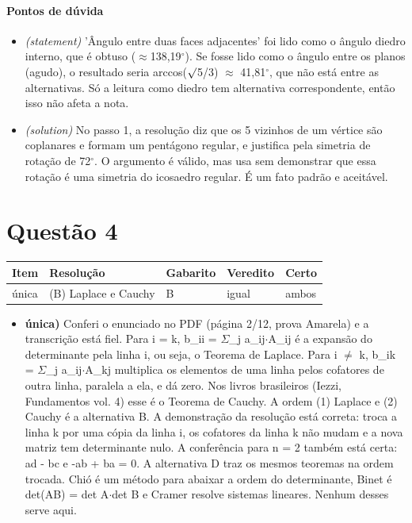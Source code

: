 \documentclass{article}%
\begin{document}
\paragraph{Pontos de dúvida}%
\begin{itemize}%
\item%
\textit{(statement)} 'Ângulo entre duas faces adjacentes' foi lido como o ângulo diedro interno, que é obtuso ($\approx$138,19$^\circ$). Se fosse lido como o ângulo entre os planos (agudo), o resultado seria arccos($\surd$5/3) $\approx$ 41,81$^\circ$, que não está entre as alternativas. Só a leitura como diedro tem alternativa correspondente, então isso não afeta a nota.%
\item%
\textit{(solution)} No passo 1, a resolução diz que os 5 vizinhos de um vértice são coplanares e formam um pentágono regular, e justifica pela simetria de rotação de 72$^\circ$. O argumento é válido, mas usa sem demonstrar que essa rotação é uma simetria do icosaedro regular. É um fato padrão e aceitável.%
\end{itemize}%
\section*{Questão 4}%
\begin{longtable}{@{}p{} p{} p{} p{} p{}@{}}\toprule Item & Resolução & Gabarito & Veredito & Certo \\ \midrule
única & (B) Laplace e Cauchy & B & igual & ambos \\
\bottomrule\end{longtable}%
\begin{itemize}%
\item%
\textbf{única)} Conferi o enunciado no PDF (página 2/12, prova Amarela) e a transcrição está fiel. Para i = k, b\_ii = $\Sigma$\_j a\_ij$\cdot$A\_ij é a expansão do determinante pela linha i, ou seja, o Teorema de Laplace. Para i $\neq$ k, b\_ik = $\Sigma$\_j a\_ij$\cdot$A\_kj multiplica os elementos de uma linha pelos cofatores de outra linha, paralela a ela, e dá zero. Nos livros brasileiros (Iezzi, Fundamentos vol. 4) esse é o Teorema de Cauchy. A ordem (1) Laplace e (2) Cauchy é a alternativa B. A demonstração da resolução está correta: troca a linha k por uma cópia da linha i, os cofatores da linha k não mudam e a nova matriz tem determinante nulo. A conferência para n = 2 também está certa: ad - bc e -ab + ba = 0. A alternativa D traz os mesmos teoremas na ordem trocada. Chió é um método para abaixar a ordem do determinante, Binet é det(AB) = det A$\cdot$det B e Cramer resolve sistemas lineares. Nenhum desses serve aqui.%
\end{itemize}%
\end{document}
